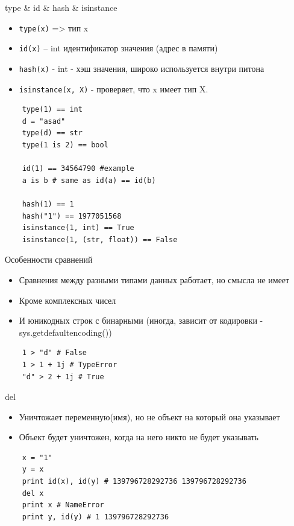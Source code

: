 \documentclass{article}
\begin{document}
\begin{center} type \& id \& hash \& isinstance \end{center}
\begin{itemize}
	\item \lstinline!type(x)! => тип x
	\item \lstinline!id(x)! – int идентификатор значения (адрес в памяти)
	\item \lstinline!hash(x)! - int - хэш значения, широко используется внутри питона
	\item \lstinline!isinstance(x, X)! - проверяет, что x имеет тип X.
\end{itemize}
\vspace{15pt}
\begin{lstlisting}
	type(1) == int
	d = "asad"
	type(d) == str
	type(1 is 2) == bool

	id(1) == 34564790 #example
	a is b # same as id(a) == id(b)

	hash(1) == 1
	hash("1") == 1977051568
	isinstance(1, int) == True
	isinstance(1, (str, float)) == False
\end{lstlisting}
\newpage

\begin{center} Особенности сравнений \end{center}
\begin{itemize}
	\item Сравнения между разными типами данных работает, но смысла не имеет
	\item Кроме комплексных чисел
	\item И юникодных строк с бинарными 
			(иногда, зависит от кодировки - sys.getdefaultencoding())
\end{itemize}
\begin{lstlisting}
	1 > "d" # False
	1 > 1 + 1j # TypeError
	"d" > 2 + 1j # True
\end{lstlisting}
\newpage

\begin{center} del \end{center}
\begin{itemize}
	\item Уничтожает переменную(имя), но не объект на который она указывает
	\item Объект будет уничтожен, когда на него никто не будет указывать
\end{itemize}
\begin{lstlisting}
	x = "1"
	y = x
	print id(x), id(y) # 139796728292736 139796728292736
	del x
	print x # NameError
	print y, id(y) # 1 139796728292736
\end{lstlisting}
\newpage

\end{document}
